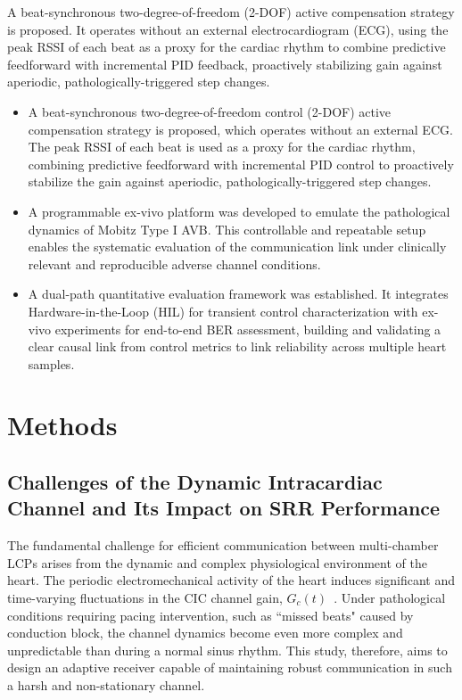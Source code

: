 \documentclass[journal]{IEEEtran}
\begin{document}
A beat-synchronous two-degree-of-freedom (2-DOF) active compensation strategy is proposed. It operates without an external electrocardiogram (ECG), using the peak RSSI of each beat as a proxy for the cardiac rhythm to combine predictive feedforward with incremental PID feedback, proactively stabilizing gain against aperiodic, pathologically-triggered step changes.


\begin{itemize}
    \item A beat-synchronous two-degree-of-freedom control (2-DOF) active compensation strategy is proposed, which operates without an external ECG. The peak RSSI of each beat is used as a proxy for the cardiac rhythm, combining predictive feedforward with incremental PID control to proactively stabilize the gain against aperiodic, pathologically-triggered step changes.

    \item A programmable ex-vivo platform was developed to emulate the pathological dynamics of Mobitz Type I AVB. This controllable and repeatable setup enables the systematic evaluation of the communication link under clinically relevant and reproducible adverse channel conditions.

    \item A dual-path quantitative evaluation framework was established. It integrates Hardware-in-the-Loop (HIL) for transient control characterization with ex-vivo experiments for end-to-end BER assessment, building and validating a clear causal link from control metrics to link reliability across multiple heart samples.
\end{itemize}



\section{Methods}
\label{sec:Methods}

\subsection{Challenges of the Dynamic Intracardiac Channel and Its Impact on SRR Performance}
\label{subsec:channel_and_impact}

The fundamental challenge for efficient communication between multi-chamber LCPs arises from the dynamic and complex physiological environment of the heart. The periodic electromechanical activity of the heart induces significant and time-varying fluctuations in the CIC channel gain, $G_c(t)$~\cite{wei2024time}. Under pathological conditions requiring pacing intervention, such as ``missed beats" caused by conduction block, the channel dynamics become even more complex and unpredictable than during a normal sinus rhythm. This study, therefore, aims to design an adaptive receiver capable of maintaining robust communication in such a harsh and non-stationary channel.
\end{document}
